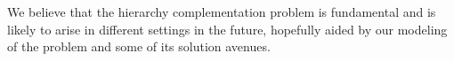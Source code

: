 We believe that the hierarchy complementation problem is fundamental
and is likely to arise in different settings in the future, hopefully
aided by our modeling of the problem and some of its solution avenues.



